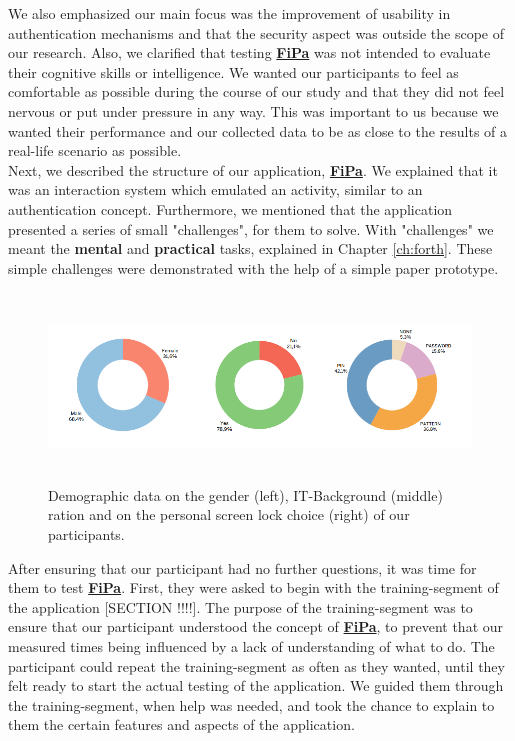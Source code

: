 We also emphasized our main focus was the improvement of usability in authentication mechanisms and that the security aspect was outside the scope of our research. Also, we clarified that testing \underline{\textbf{FiPa}} was not intended to evaluate their cognitive skills or intelligence. We wanted our participants to feel as comfortable as possible during the course of our study and that they did not feel nervous or put under pressure in any way. This was important to us because we wanted their performance and our collected data to be as close to the results of a real-life scenario as possible. \\

Next, we described the structure of our application, \underline{\textbf{FiPa}}. We explained that it was an interaction system which emulated an activity, similar to an authentication concept. Furthermore, we mentioned that the application presented a series of small "challenges", for them to solve. With "challenges" we meant the \textbf{mental} and \textbf{practical} tasks, explained in Chapter \ref{ch:forth}. These simple challenges were demonstrated with the help of a simple paper prototype.\\

\begin{figure}[t!]
\centering
\includegraphics[width=15cm, height=5cm]{Chapters/graphics/Demos.PNG}
\caption{Demographic data on the gender (left), IT-Background (middle) ration and on the personal screen lock choice (right) of our participants.}
\label{fig:demo}
\end{figure}

After ensuring that our participant had no further questions, it was time for them to test \underline{\textbf{FiPa}}. First, they were asked to begin with the training-segment of the application [SECTION !!!!]. The purpose of the training-segment was to ensure that our participant understood the concept of \underline{\textbf{FiPa}}, to prevent that our measured times being influenced by a lack of understanding of what to do. The participant could repeat the training-segment as often as they wanted, until they felt ready to start the actual testing of the application. We guided them through the training-segment, when help was needed, and took the chance to explain to them the certain features and aspects of the application. \\

